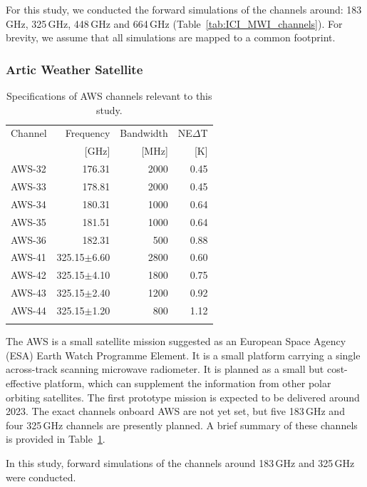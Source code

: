\documentclass[amt, manuscript]{copernicus}
\begin{document}
For this study, we conducted the forward simulations of the channels around: 183\,GHz, 325\,GHz, 448\,GHz and 664\,GHz (Table~\ref{tab:ICI_MWI_channels}). For brevity, we assume that all simulations are mapped to a common footprint.

\subsubsection{Artic Weather Satellite}
%
\begin{table}[t]
	\caption{Specifications of AWS channels relevant to this study.}
	\label{tab:specifications_AWS}	
	\begin{tabular}{lrrr}
		\tophline
		Channel & Frequency 	& Bandwidth & NE$\Delta$T \\
				& [GHz]			& [MHz]		& [K]		\\
		\middlehline
		AWS-32	&	176.31    & 2000	&	0.45	\\
		AWS-33	&	178.81    & 2000 	&	0.45\\
		AWS-34	&	180.31    & 1000 	&	0.64\\
		AWS-35	&	181.51    & 1000 	&	0.64 \\
		AWS-36	&	182.31    & \phantom{0}500  &	0.88 \\
		AWS-41  & 325.15$\pm$6.60    & 2800 	 &0.60\\
		AWS-42  & 325.15$\pm$4.10    & 1800    &0.75	\\
		AWS-43  & 325.15$\pm$2.40    & 1200    &0.92\\
		AWS-44  & 325.15$\pm$1.20    & \phantom{0}800  &1.12  \\
		\bottomhline
	\end{tabular}
	\belowtable{} %
\end{table}
The AWS is a small satellite mission suggested as an European Space Agency (ESA) Earth Watch Programme Element. It is a small platform carrying a single across-track scanning microwave radiometer. It is planned as a small but cost-effective platform, which can supplement the information from other polar orbiting satellites. The first prototype mission is expected to be delivered around 2023. The exact channels onboard AWS are not yet set, but five 183\,GHz and four 325\,GHz channels are presently planned. A brief summary of these channels is provided in Table~\ref{tab:specifications_AWS}.
 
In this study, forward simulations of the channels around 183\,GHz and 325\,GHz were conducted. 
\end{document}
